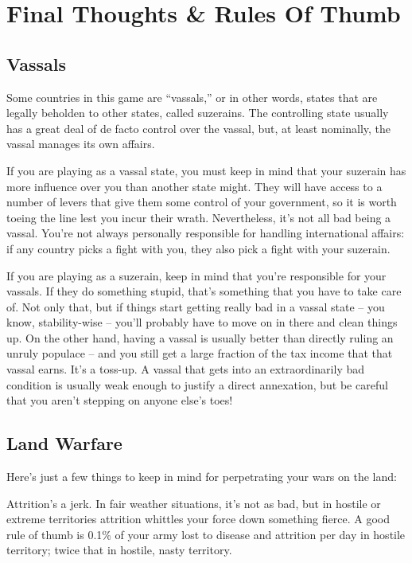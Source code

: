 \documentclass[11 pt]{scrartcl}
\begin{document}
\section{Final Thoughts \& Rules Of Thumb}

\subsection{Vassals}

Some countries in this game are ``vassals,'' or in other words, states that are legally beholden to other states, called suzerains. The controlling state usually has a great deal of de facto control over the vassal, but, at least nominally, the vassal manages its own affairs.

If you are playing as a vassal state, you must keep in mind that your suzerain has more influence over you than another state might. They will have access to a number of levers that give them some control of your government, so it is worth toeing the line lest you incur their wrath. Nevertheless, it’s not all bad being a vassal. You’re not always personally responsible for handling international affairs: if any country picks a fight with you, they also pick a fight with your suzerain.

If you are playing as a suzerain, keep in mind that you’re responsible for your vassals. If they do something stupid, that’s something that you have to take care of. Not only that, but if things start getting really bad in a vassal state – you know, stability-wise – you’ll probably have to move on in there and clean things up. On the other hand, having a vassal is usually better than directly ruling an unruly populace – and you still get a large fraction of the tax income that that vassal earns. It’s a toss-up. A vassal that gets into an extraordinarily bad condition is usually weak enough to justify a direct annexation, but be careful that you aren’t stepping on anyone else’s toes!

\subsection{Land Warfare}

Here’s just a few things to keep in mind for perpetrating your wars on the land:

Attrition’s a jerk. In fair weather situations, it’s not as bad, but in hostile or extreme territories attrition whittles your force down something fierce.  A good rule of thumb is 0.1\% of your army lost to disease and attrition per day in hostile territory; twice that in hostile, nasty territory.
\end{document}
